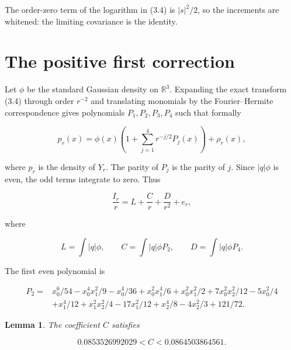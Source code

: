 \documentclass[11pt]{article}
\newtheorem{lemma}[theorem]{Lemma}
\begin{document}
The order-zero term of the logarithm in (3.4) is $|s|^2/2$, so the increments are whitened: the limiting covariance is the identity.

\section{The positive first correction}

Let $\phi$ be the standard Gaussian density on $\mathbb R^3$.  Expanding the exact transform (3.4) through order $r^{-2}$ and translating monomials by the Fourier--Hermite correspondence gives polynomials $P_1,P_2,P_3,P_4$ such that formally

\[
p_r(x)=\phi(x)\left(1+\sum_{j=1}^4r^{-j/2}P_j(x)\right)
+\rho_r(x),                                             \tag{4.1}
\]

where $p_r$ is the density of $Y_r$.  The parity of $P_j$ is the parity of $j$.  Since $|q|\phi$ is even, the odd terms integrate to zero.  Thus

\[
\frac{I_r}{r}=L+\frac Cr+\frac D{r^2}+e_r,              \tag{4.2}
\]

where

\[
L=\int|q|\phi,\qquad
C=\int|q|\phi P_2,\qquad
D=\int|q|\phi P_4.                                     \tag{4.3}
\]

The first even polynomial is

\[
\begin{aligned}
P_2={}&x_0^6/54-x_0^4x_1^2/9-x_0^4/36+x_0^2x_1^4/6
+x_0^2x_1^2/2+7x_0^2x_2^2/12-5x_0^2/4\\
&+x_1^4/12+x_1^2x_2^2/4-17x_1^2/12
+x_2^4/8-4x_2^2/3+121/72.
\end{aligned}                                      \tag{4.4}
\]

\begin{lemma}
The coefficient $C$ satisfies

\[
0.0853526992029<C<0.0864503864561.                       \tag{4.5}
\]

\end{lemma}
\end{document}
